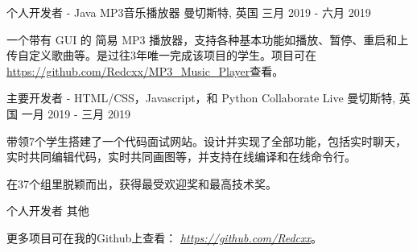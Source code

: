 \begin{cventries}
  \cventry
    {个人开发者 - Java} %
    {MP3音乐播放器} %
    {曼切斯特, 英国} %
    {三月 2019 - 六月 2019} %
    {
      \begin{cvitems} %
        \item {一个带有 GUI 的 简易 MP3 播放器，支持各种基本功能如播放、暂停、重启和上传自定义歌曲等。是过往3年唯一完成该项目的学生。项目可在\href{https://github.com/Redcxx/MP3_Music_Player}{https://github.com/Redcxx/MP3\_Music\_Player}查看。}
      \end{cvitems}
    }
    
  \cventry
    {主要开发者 - HTML/CSS，Javascript，和 Python} %
    {Collaborate Live} %
    {曼切斯特, 英国} %
    {一月 2019 - 三月 2019} %
    {
      \begin{cvitems} %
        \item {带领7个学生搭建了一个代码面试网站。设计并实现了全部功能，包括实时聊天，实时共同编辑代码，实时共同画图等，并支持在线编译和在线命令行。}
        \item {在37个组里脱颖而出，获得最受欢迎奖和最高技术奖。}
      \end{cvitems}
    }
  

  \cventry
    {个人开发者} %
    {其他} %
    {} %
    {} %
    {
      \begin{cvitems} %
        \item {更多项目可在我的Github上查看： \href{https://github.com/Redcxx}{\textit{https://github.com/Redcxx}}。}
      \end{cvitems}
    }
  
    


\end{cventries}

